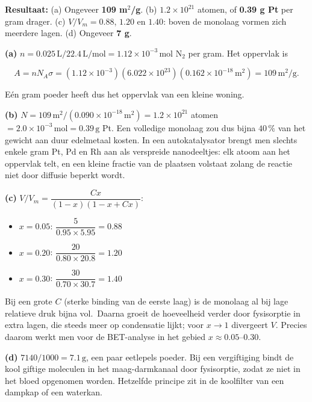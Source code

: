 \begin{oplossing}
\textbf{Resultaat:} (a) Ongeveer \textbf{109 m\ensuremath{^{2}}/g}. (b) \(1.2\times10^{21}\) atomen, of \textbf{0.39 g Pt} per gram drager. (c) \(V/V_m = 0.88\), \(1.20\) en \(1.40\): boven de monolaag vormen zich meerdere lagen. (d) Ongeveer \textbf{7 g}.

\textbf{(a)} \(n = 0.025\,\mathrm{L}/22.4\,\mathrm{L/mol} = 1.12\times10^{-3}\,\mathrm{mol}\) \(\mathrm{N_2}\) per gram. Het oppervlak is

\[
A = n N_A \sigma = (1.12\times10^{-3})(6.022\times10^{23})(0.162\times10^{-18}\,\mathrm{m^2}) = 109\,\mathrm{m^2/g}.
\]

Eén gram poeder heeft dus het oppervlak van een kleine woning.

\textbf{(b)} \(N = 109\,\mathrm{m^2}/(0.090\times10^{-18}\,\mathrm{m^2}) = 1.2\times10^{21}\) atomen \(= 2.0\times10^{-3}\,\mathrm{mol} = 0.39\,\mathrm{g}\) Pt. Een volledige monolaag zou dus bijna \(40\,\%\) van het gewicht aan duur edelmetaal kosten. In een autokatalysator brengt men slechts enkele gram Pt, Pd en Rh aan als verspreide nanodeeltjes: elk atoom aan het oppervlak telt, en een kleine fractie van de plaatsen volstaat zolang de reactie niet door diffusie beperkt wordt.

\textbf{(c)} \(V/V_m = \dfrac{Cx}{(1 - x)(1 - x + Cx)}\):

\begin{itemize}
\item
  \(x = 0.05\): \(\dfrac{5}{0.95 \times 5.95} = 0.88\)
\item
  \(x = 0.20\): \(\dfrac{20}{0.80 \times 20.8} = 1.20\)
\item
  \(x = 0.30\): \(\dfrac{30}{0.70 \times 30.7} = 1.40\)
\end{itemize}

Bij een grote \(C\) (sterke binding van de eerste laag) is de monolaag al bij lage relatieve druk bijna vol.~Daarna groeit de hoeveelheid verder door fysisorptie in extra lagen, die steeds meer op condensatie lijkt; voor \(x \to 1\) divergeert \(V\). Precies daarom werkt men voor de BET-analyse in het gebied \(x \approx 0.05\)--\(0.30\).

\textbf{(d)} \(7140/1000 = 7.1\,\mathrm{g}\), een paar eetlepels poeder. Bij een vergiftiging bindt de kool giftige moleculen in het maag-darmkanaal door fysisorptie, zodat ze niet in het bloed opgenomen worden. Hetzelfde principe zit in de koolfilter van een dampkap of een waterkan.
\end{oplossing}

